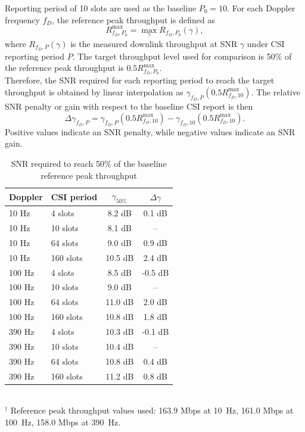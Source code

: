 \documentclass[a4paper,12pt,onecolumn]{article}
\begin{document}
		\begin{highlightblock}
				Reporting period of 10 slots are used as the baseline $P_0=10$. For each Doppler frequency \(f_D\), the reference peak throughput is defined as
			\begin{equation}
				R^{\max}_{f_D,P_0}
				=
				\max_{\gamma} R_{f_D,P_0}(\gamma),
			\end{equation}
			where \(R_{f_D,P}(\gamma)\) is the measured downlink throughput at SNR \(\gamma\) under CSI reporting period \(P\). The target throughput level used for comparison is 50\% of the reference peak throughput is $
				0.5 R^{\max}_{f_D,P_0}
				$. \\

			Therefore, the SNR required for each reporting period to reach the target throughput is obtained by linear interpolation as 
			$\gamma_{f_D,P}(0.5R^{\max}_{f_D,10})$. The relative SNR penalty or gain with respect to the baseline CSI report is then
			\begin{equation}
				\Delta \gamma_{f_D,P}
				=
				\gamma_{f_D,P}(0.5R^{\max}_{f_D,10})
				-
				\gamma_{f_D,10}(0.5R^{\max}_{f_D,10}).
			\end{equation}
			Positive values indicate an SNR penalty, while negative values indicate an SNR gain.
		\end{highlightblock}
		
		\begin{table}[H]
			\centering
			\caption{SNR required to reach 50\% of the baseline reference peak throughput}
			\label{tab:csi_period_snr_required}
			\begin{tabular}{llcc}
				\midrule
				\textbf{Doppler} & \textbf{CSI period} & \(\gamma_{50\%}\) & \(\Delta\gamma\) \\
				\toprule
				10 Hz  & 4 slots   & 8.2 dB & 0.1 dB \\
				10 Hz  & 10 slots  & 8.1 dB & -- \\
				10 Hz  & 64 slots  & 9.0 dB & 0.9 dB \\
				10 Hz  & 160 slots & 10.5 dB & 2.4 dB \\
				\midrule
				100 Hz & 4 slots   & 8.5 dB & -0.5 dB \\
				100 Hz & 10 slots  & 9.0 dB & -- \\
				100 Hz & 64 slots  & 11.0 dB & 2.0 dB \\
				100 Hz & 160 slots & 10.8 dB & 1.8 dB \\
				\midrule
				390 Hz & 4 slots   & 10.3 dB & -0.1 dB \\
				390 Hz & 10 slots  & 10.4 dB & -- \\
				390 Hz & 64 slots  & 10.8 dB & 0.4 dB \\
				390 Hz & 160 slots & 11.2 dB & 0.8 dB \\
				\bottomrule
			\end{tabular} \\
			$^\dagger$ Reference peak throughput values used: 
			163.9 Mbps at 10~Hz, 161.0 Mbps at 100~Hz, 158.0 Mbps at 390~Hz.
			
		\end{table}
		
\end{document}
